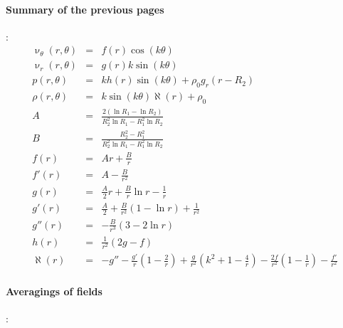 \paragraph{Summary of the previous pages}:
\begin{eqnarray}
\upnu_\theta(r,\theta) &=& f(r) \cos(k\theta) \\
\upnu_r(r,\theta) &=& g(r) k  \sin(k\theta)  \\
p(r,\theta) &=& k h(r) \sin(k \theta) + \rho_0 g_r (r-R_2)  \\
\rho(r,\theta) &=& k \sin (k \theta) \aleph(r) + \rho_0 \\
A &=& \frac{2(\ln R_1 - \ln R_2)} { R_2^2 \ln R_1  - R_1^2 \ln R_2}    \\
B &=& \frac{R_2^2-R_1^2}{R_2^2 \ln R_1 - R_1^2 \ln R_2} \\
f(r)   &=& Ar +\frac{B}{r} \\
f'(r)  &=& A - \frac{B}{r^2} \\
g(r)   &=& \frac{A}{2}r  +  \frac{B}{r} \ln r - \frac{1}{r} \\
g'(r)  &=& \frac{A}{2}  +  \frac{B}{r^2} (1-\ln r)   + \frac{1}{r^2} \\
g''(r) &=&  - \frac{B}{r^3} (3 - 2 \ln r )  \\
h(r)   &=& \frac{1}{r^2}(2g-f) \\
\aleph(r) &=&  -g'' - \frac{g'}{r} ( 1 - \frac{2}{r}) + \frac{g}{r^2} (k^2 + 1 -\frac{4}{r})  - \frac{2f}{r^2}  (1-\frac{1}{r}) - \frac{f'}{r^2}   
\end{eqnarray}

\paragraph{Averagings of fields}:

